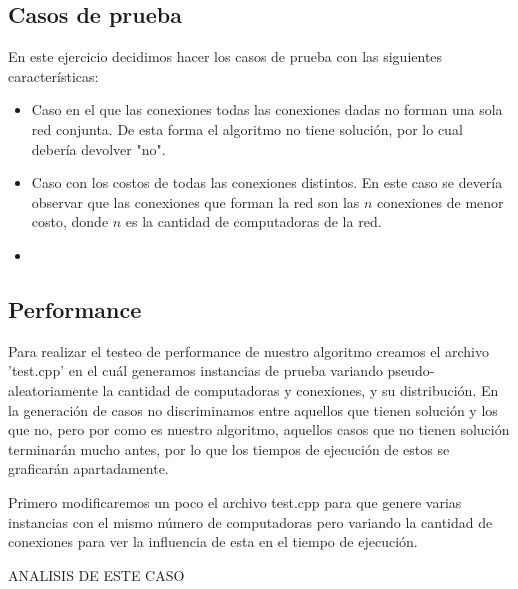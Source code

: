 \newpage


\subsection{Casos de prueba}

En este ejercicio decidimos hacer los casos de prueba con las siguientes caracter\'isticas:

\begin{itemize}
\item Caso en el que las conexiones todas las conexiones dadas no forman una sola red conjunta. De esta forma el algoritmo no tiene solución, por lo cual debería devolver "no".
\item Caso con los costos de todas las conexiones distintos. En este caso se devería observar que las conexiones que forman la red son las $n$ conexiones de menor costo, donde $n$ es la cantidad de computadoras de la red.
\item 
\end{itemize}


\newpage


\subsection{Performance}

Para realizar el testeo de performance de nuestro algoritmo creamos el archivo 'test.cpp' en el cu\'al generamos instancias de prueba variando pseudo-aleatoriamente la cantidad de computadoras y conexiones, y su distribuci\'on.
En la generación de casos no discriminamos entre aquellos que tienen soluci\'on y los que no, pero por como es nuestro algoritmo, aquellos casos que no tienen soluci\'on terminarán mucho antes, por lo que los tiempos de ejecuci\'on de estos se graficarán apartadamente.

Primero modificaremos un poco el archivo test.cpp para que genere varias instancias con el mismo n\'umero de computadoras pero variando la cantidad de conexiones para ver la influencia de esta en el tiempo de ejecuci\'on.

ANALISIS DE ESTE CASO




